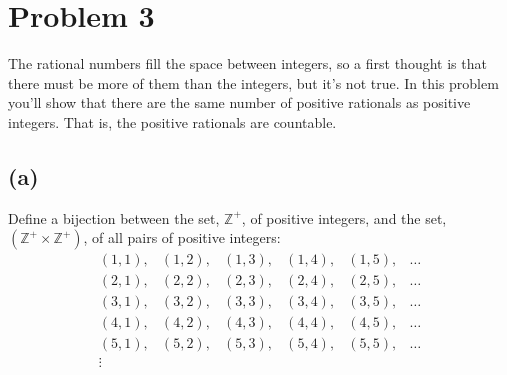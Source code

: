 \documentclass[14pt]{extarticle}
\begin{document}
\section{Problem 3}
The rational numbers fill the space between integers, so a first thought is that there must be more of them than the integers, but it’s not true. In this problem you’ll show that there are the same number of positive rationals as positive integers. That is, the positive rationals are countable.

\subsection{(a)}
Define a bijection between the set, $\mathbb{Z}^+$, of positive integers, and the set, $(\mathbb{Z}^+ \times \mathbb{Z}^+)$, of all pairs of positive integers:
$$
\begin{array}{cccccc}
(1,1),&(1,2),&(1,3),&(1,4),&(1,5),&\ldots\\
(2,1),&(2,2),&(2,3),&(2,4),&(2,5),&\ldots\\
(3,1),&(3,2),&(3,3),&(3,4),&(3,5),&\ldots\\
(4,1),&(4,2),&(4,3),&(4,4),&(4,5),&\ldots\\
(5,1),&(5,2),&(5,3),&(5,4),&(5,5),&\ldots\\
\vdots
\end{array}
$$
\end{document}
